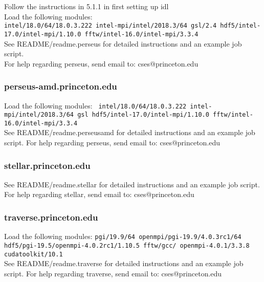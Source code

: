 Follow the instructions in 5.1.1 in first setting up idl 
\\
Load the following modules:
\\
\texttt{intel/18.0/64/18.0.3.222		intel-mpi/intel/2018.3/64		gsl/2.4
hdf5/intel-17.0/intel-mpi/1.10.0	fftw/intel-16.0/intel-mpi/3.3.4
}\\
See README/readme.perseus for detailed instructions and an example job script.
\\
For help regarding perseus, send email to:  cses@princeton.edu

\subsubsection{perseus-amd.princeton.edu}
Load the following modules:
\texttt{
intel/18.0/64/18.0.3.222		intel-mpi/intel/2018.3/64		gsl
hdf5/intel-17.0/intel-mpi/1.10.0	fftw/intel-16.0/intel-mpi/3.3.4
}\\
See README/readme.perseusamd for detailed instructions and an example job script.
\newline\newline
For help regarding perseus, send email to:  cses@princeton.edu
\subsubsection{stellar.princeton.edu}

See README/readme.stellar for detailed instructions and an example job script.
\\
For help regarding stellar, send email to:  cses@princeton.edu

\subsubsection{traverse.princeton.edu}
Load the following modules:
\texttt{pgi/19.9/64		openmpi/pgi-19.9/4.0.3rc1/64 		hdf5/pgi-19.5/openmpi-4.0.2rc1/1.10.5
fftw/gcc/ openmpi-4.0.1/3.3.8		cudatoolkit/10.1
}\\
See README/readme.traverse for detailed instructions and an example job script.
\newline\newline
For help regarding traverse, send email to:  cses@princeton.edu

